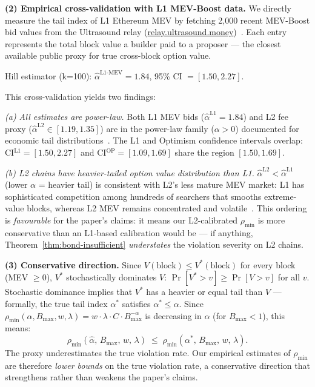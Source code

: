 \textbf{(2) Empirical cross-validation with L1 MEV-Boost data.}
We directly measure the tail index of L1 Ethereum MEV by fetching 2,000 recent
MEV-Boost bid values from the Ultrasound relay
(\url{relay.ultrasound.money})~\cite{ultrasound-relay}.
Each entry represents the total block value a builder paid to a proposer ---
the closest available public proxy for true cross-block option value.

Hill estimator (k=100): $\hat{\alpha}^{\text{L1-MEV}} = 1.84$,
95\% CI $= [1.50, 2.27]$.

This cross-validation yields two findings:

\emph{(a) All estimates are power-law.}
Both L1 MEV bids ($\hat{\alpha}^{\text{L1}} = 1.84$) and L2 fee proxy
($\hat{\alpha}^{\text{L2}} \in [1.19, 1.35]$) are in the power-law family
($\alpha > 0$) documented for economic tail
distributions~\cite{Gabaix2009, daian2020flash}.
The L1 and Optimism confidence intervals overlap:
CI$^{\text{L1}} = [1.50, 2.27]$ and CI$^{\text{OP}} = [1.09, 1.69]$
share the region $[1.50, 1.69]$.

\emph{(b) L2 chains have heavier-tailed option value distribution than L1.}
$\hat{\alpha}^{\text{L2}} < \hat{\alpha}^{\text{L1}}$ (lower $\alpha$ = heavier
tail) is consistent with L2's less mature MEV market:
L1 has sophisticated competition among hundreds of searchers that smooths
extreme-value blocks, whereas L2 MEV remains concentrated and
volatile~\cite{obadia2021unity}.
This ordering is \emph{favourable} for the paper's claims: it means our
L2-calibrated $\rho_{\min}$ is more conservative than an L1-based calibration
would be --- if anything, Theorem~\ref{thm:bond-insufficient} \emph{understates}
the violation severity on L2 chains.

\textbf{(3) Conservative direction.}
Since $V(\text{block}) \leq V^*(\text{block})$ for every block (MEV $\geq 0$),
$V^*$ stochastically dominates $V$:
$\Pr[V^* > v] \geq \Pr[V > v]$ for all $v$.
Stochastic dominance implies that $V^*$ has a heavier or equal tail than $V$
--- formally, the true tail index $\alpha^*$ satisfies $\alpha^* \leq \hat{\alpha}$.
Since $\rho_{\min}(\alpha, B_{\max}, w, \lambda) = w \cdot \lambda \cdot
C \cdot B_{\max}^{-\alpha}$ is decreasing in $\alpha$ (for $B_{\max} < 1$),
this means:
\[
  \rho_{\min}(\hat{\alpha},\, B_{\max},\, w,\, \lambda)
  \;\leq\;
  \rho_{\min}(\alpha^*,\, B_{\max},\, w,\, \lambda).
\]
The proxy underestimates the true violation rate. Our empirical estimates of
$\rho_{\min}$ are therefore \emph{lower bounds} on the true violation rate,
a conservative direction that strengthens rather than weakens the paper's claims.

